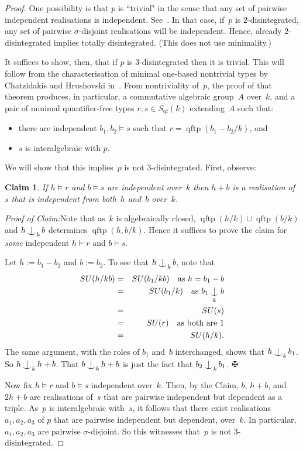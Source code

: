 \documentclass[\DocOpts]{amsart}
\newtheorem{claim}[theorem]{Claim}
\theoremstyle{definition}
\def\qftp{\operatorname{qftp}}
\def\qf{\operatorname{qf}}
\newcommand{\<}{\langle}
\renewcommand{\>}{\rangle}
\def\Ind#1#2{#1\setbox0=\hbox{\(#1x\)}\kern\wd0\hbox to 
0pt{\hss\(#1\mid\)\hss}\lower.9\ht0\hbox to 
0pt{\hss\(#1\smile\)\hss}\kern\wd0}
\def\ind{\mathop{\mathpalette\Ind{}}}
\newcommand{\qedv}{\vspace{.1in}\hfill\(\maltese\)}
\newenvironment{claimproof}[1]{%
\par\vspace{.1in}\noindent\emph{Proof of Claim:}\space#1}{\qedv}
\begin{document}
\begin{proof}
One possibility is that $p$ is ``trivial" in the sense that any set of pairwise independent realisations is independent.
See~\cite[Definition~3.1(5)]{acfa}.
In that case, if~$p$ is $2$-disintegrated, any set of pairwise $\sigma$-disjoint realisations will be independent.
Hence, already $2$-disintegrated implies totally disintegrated.
(This does not use minimality.)

It suffices to show, then, that if $p$ is $3$-disintegrated then it is trivial.
This will follow from the characterisation of minimal one-based nontrivial types by Chatzidakis and Hrushovski in~\cite[Theorem~5.12]{acfa}.
From nontriviality of~$p$, the proof of that theorem produces, in particular,
a commutative algebraic group~$A$ over~$k$,
and a pair of minimal quantifier-free types $r,s\in S_{\qf}(k)$ extending~$A$ such that:
\begin{itemize}
\item[(i)]
there are independent $b_1,b_2\models s$ such that $r=\qftp(b_1-b_2/k)$, and
\item[(ii)]
$s$ is interalgebraic with $p$.
\end{itemize}
We will show that this implies~$p$ is not $3$-disintegrated.
First, observe:

\begin{claim}
If $h\models r$ and $b\models s$ are independent over~$k$ then $h+b$ is a realisation of~$s$ that is independent from both~$h$ and~$b$ over~$k$.
\end{claim}

\begin{claimproof}
Note that as~$k$ is algebraically closed, $\qftp(h/k)\cup \qftp(b/k)$ and $h\ind_kb$ determines $\qftp(h,b/k)$.
Hence it suffices to prove the claim for {\em some} independent $h\models r$ and $b\models s$.

Let $h:=b_1-b_2$ and $b:=b_2$.
To see that $h\ind_kb$, note that
\begin{eqnarray*}
SU(h/kb)
&=&
SU(b_1/kb)\ \ \text{ as $h=b_1-b$}\\
&=&
SU(b_1/k)\ \ \text{ as $b_1\ind_kb$}\\
&=&
SU(s)\\
&=&
SU(r)\ \ \text{ as both are~$1$}\\
&=&
SU(h/k).
\end{eqnarray*}
The same argument, with the roles of $b_1$ and~$b$ interchanged, shows that $h\ind_kb_1$.
So $h\ind_kh+b$.
That $b\ind_kh+b$ is just the fact that $b_2\ind_kb_1$.
\end{claimproof}

Now fix $h\models r$ and $b\models s$ independent over~$k$.
Then, by the Claim, $b$, $h+b$, and $2h+b$ are realisations of~$s$ that are pairwise independent but dependent as a triple.
As~$p$ is interalgebraic with~$s$, it follows that there exist realisations $a_1,a_2,a_3$ of $p$ that are pairwise independent but dependent, over~$k$.
In particular, $a_1,a_2,a_3$ are pairwise $\sigma$-disjoint.
So this witnesses that~$p$ is not $3$-disintegrated.
\end{proof}
\end{document}
